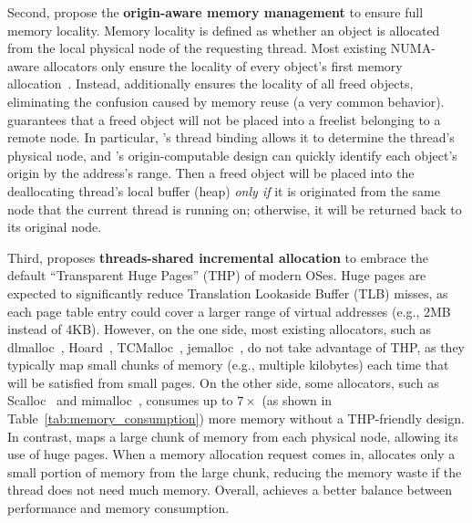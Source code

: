 Second, \NM{} propose the \textbf{origin-aware memory management} to ensure full memory locality. Memory locality is defined as whether an object is allocated from the local physical node of the requesting thread. Most existing NUMA-aware allocators only ensure the locality of every object's first memory allocation~\cite{tcmallocnew, kim2013node, yang2019jarena}.  Instead, \NM{} additionally ensures the locality of all freed objects, eliminating the confusion caused by memory reuse (a very common behavior). \NM{} guarantees that a freed object will not be placed into a freelist belonging to a remote node. In particular, \NM{}'s thread binding allows it to determine the thread's physical node, and \NM{}'s origin-computable design can quickly identify each object's origin by the address's range. Then a freed object will be placed into the deallocating thread's local buffer (heap) \textit{only if} it is originated from the same node that the current thread is running on; otherwise, it will be returned back to its original node. 

Third, \NM{} proposes \textbf{threads-shared incremental allocation} to embrace the default ``Transparent Huge Pages'' (THP) of modern OSes. Huge pages are expected to significantly reduce Translation Lookaside Buffer (TLB) misses, as each page table entry could cover a larger range of virtual addresses (e.g., 2MB instead of 4KB). However, on the one side, most existing allocators, such as dlmalloc~\cite{dlmalloc},  Hoard~\cite{Hoard}, TCMalloc~\cite{tcmalloc}, jemalloc~\cite{jemalloc}, do not take advantage of THP, as they typically map small chunks of memory (e.g., multiple kilobytes) each time that will be satisfied from small pages. On the other side, some allocators, such as Scalloc~\cite{Scalloc} and mimalloc~\cite{mimalloc}, consumes up to $7\times$ (as shown in Table~\ref{tab:memory_consumption}) more memory without a THP-friendly design. 
In contrast, \NM{} maps a large chunk of memory from each physical node, allowing its use of huge pages. When a memory allocation request comes in, \NM{} allocates only a small portion of memory from the large chunk, reducing the memory waste if the thread does not need much memory.
Overall, \NM{} achieves a better balance between performance and memory consumption. 

